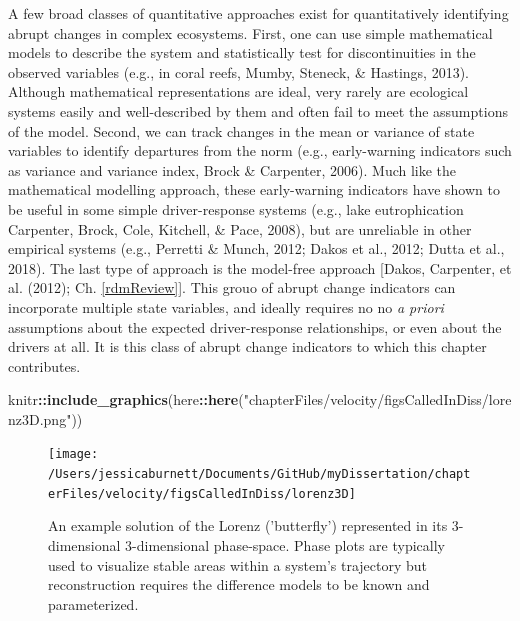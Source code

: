 \documentclass[12pt,twoside,openany]{reedthesis}
\newenvironment{Shaded}{\begin{snugshade}}{\end{snugshade}}
\newcommand{\KeywordTok}[1]{\textcolor[rgb]{0.13,0.29,0.53}{\textbf{#1}}}
\newcommand{\NormalTok}[1]{#1}
\newcommand{\OperatorTok}[1]{\textcolor[rgb]{0.81,0.36,0.00}{\textbf{#1}}}
\newcommand{\StringTok}[1]{\textcolor[rgb]{0.31,0.60,0.02}{#1}}
\begin{document}
A few broad classes of quantitative approaches exist for quantitatively identifying abrupt changes in complex ecosystems. First, one can use simple mathematical models to describe the system and statistically test for discontinuities in the observed variables (e.g., in coral reefs, Mumby, Steneck, \& Hastings, 2013). Although mathematical representations are ideal, very rarely are ecological systems easily and well-described by them and often fail to meet the assumptions of the model. Second, we can track changes in the mean or variance of state variables to identify departures from the norm (e.g., early-warning indicators such as variance and variance index, Brock \& Carpenter, 2006). Much like the mathematical modelling approach, these early-warning indicators have shown to be useful in some simple driver-response systems (e.g., lake eutrophication Carpenter, Brock, Cole, Kitchell, \& Pace, 2008), but are unreliable in other empirical systems (e.g., Perretti \& Munch, 2012; Dakos et al., 2012; Dutta et al., 2018). The last type of approach is the model-free approach {[}Dakos, Carpenter, et al. (2012); Ch. \ref{rdmReview}{]}. This grouo of abrupt change indicators can incorporate multiple state variables, and ideally requires no no \emph{a priori} assumptions about the expected driver-response relationships, or even about the drivers at all. It is this class of abrupt change indicators to which this chapter contributes.
\begin{Shaded}
\begin{Highlighting}[]
\NormalTok{knitr}\OperatorTok{::}\KeywordTok{include_graphics}\NormalTok{(here}\OperatorTok{::}\KeywordTok{here}\NormalTok{(}\StringTok{"chapterFiles/velocity/figsCalledInDiss/lorenz3D.png"}\NormalTok{))}
\end{Highlighting}
\end{Shaded}
\begin{figure}
\texttt{[image: /Users/jessicaburnett/Documents/GitHub/myDissertation/chapterFiles/velocity/figsCalledInDiss/lorenz3D]} \caption{An example solution of the Lorenz ('butterfly') represented in its 3-dimensional 3-dimensional phase-space. Phase plots are typically used to visualize stable areas within a system's trajectory but reconstruction requires the difference models to be known and parameterized.}\label{fig:lorenz3D}
\end{figure}
\end{document}
